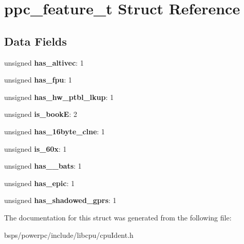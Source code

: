 \hypertarget{structppc__feature__t}{}\section{ppc\+\_\+feature\+\_\+t Struct Reference}
\label{structppc__feature__t}
\subsection*{Data Fields}
\begin{DoxyCompactItemize}
\item 
\mbox{\label{structppc__feature__t_a0cc2d3e67f289ae74db6d11972107892}} 
unsigned {\bfseries has\+\_\+altivec}\+: 1
\item 
\mbox{\label{structppc__feature__t_a6b37afe466b8d842db63311ba741fb3e}} 
unsigned {\bfseries has\+\_\+fpu}\+: 1
\item 
\mbox{\label{structppc__feature__t_a9233cece90995fe486dde47ecbd6abfc}} 
unsigned {\bfseries has\+\_\+hw\+\_\+ptbl\+\_\+lkup}\+: 1
\item 
\mbox{\label{structppc__feature__t_a0d09528f94e7c5a01de659793f5eacd9}} 
unsigned {\bfseries is\+\_\+bookE}\+: 2
\item 
\mbox{\label{structppc__feature__t_a5f7c1ffc73fb2ea30f33063da25e98d7}} 
unsigned {\bfseries has\+\_\+16byte\+\_\+clne}\+: 1
\item 
\mbox{\label{structppc__feature__t_afdde77fcc33116e76ea704b8f8e3f54a}} 
unsigned {\bfseries is\+\_\+60x}\+: 1
\item 
\mbox{\label{structppc__feature__t_ae3afa97f371f941ef89412c614995c7e}} 
unsigned {\bfseries has\+\_\+\_\+bats}\+: 1
\item 
\mbox{\label{structppc__feature__t_a41dd4a812e91fd8b099decb78eb42ff1}} 
unsigned {\bfseries has\+\_\+epic}\+: 1
\item 
\mbox{\label{structppc__feature__t_acdb90c26519565a447c8124aab59963e}} 
unsigned {\bfseries has\+\_\+shadowed\+\_\+gprs}\+: 1
\end{DoxyCompactItemize}


The documentation for this struct was generated from the following file\+:\begin{DoxyCompactItemize}
\item 
bsps/powerpc/include/libcpu/cpu\+Ident.\+h\end{DoxyCompactItemize}
